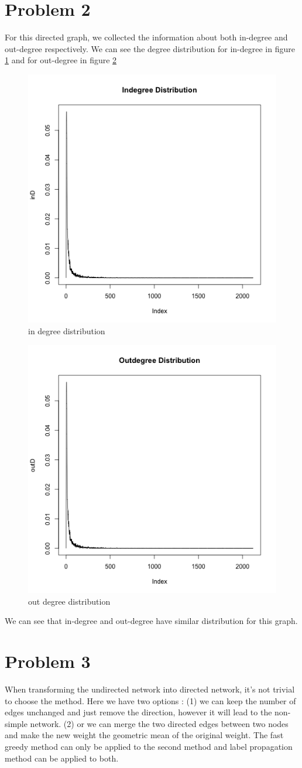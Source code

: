 \documentclass{article}
\begin{document}
\section{Problem 2}
For this directed graph, we collected the information about both in-degree and out-degree respectively.
We can see the degree distribution for in-degree in figure \ref{fig:p2_1} and for out-degree in figure \ref{fig:p2_2}
\begin{figure}[htbp]
\centering
\includegraphics[width=.6\textwidth]{p2_in.png}
\caption{in degree distribution}
\label{fig:p2_1}
\end{figure}
\begin{figure}[htbp]
\centering
\includegraphics[width=.6\textwidth]{p2_out.png}
\caption{out degree distribution}
\label{fig:p2_2}
\end{figure}
We can see that in-degree and out-degree have similar distribution for this graph.
\newpage
\section{Problem 3}
When transforming the undirected network into directed network, it's not trivial to choose the method. Here we have two options : (1) we can keep the number of edges unchanged and just remove the direction, however it will lead to the  non-simple network. (2) or we can merge the two directed edges between two nodes and make the new weight the geometric mean of the original weight. The fast greedy method can only be applied to the second method and label propagation method can be applied to both.
\end{document}
